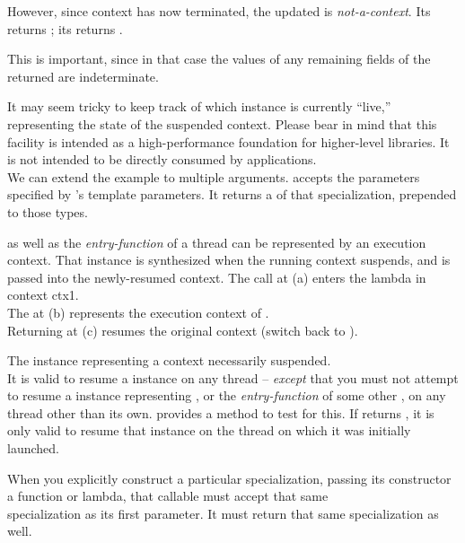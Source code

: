 However, since context  has now terminated, the updated 
is \emph{not-a-context}. Its  returns ;
its  returns .

This is important, since in that case the values of any remaining fields of
the returned  are indeterminate.

It may seem tricky to keep track of which \ectx instance is currently
``live,'' representing the state of the suspended context. Please bear in
mind that this facility is intended as a high-performance foundation for
higher-level libraries. It is not intended to be directly consumed by
applications.\\
\newpage
We can extend the example to multiple arguments.
\op accepts the parameters specified by \ectx's template parameters. It
returns a  of that \ectx specialization, prepended to those
types.


\main as well as the \emph{entry-function} of a thread can be represented by an
execution context. That \ectx instance is synthesized when the running context
suspends, and is passed into the newly-resumed context.
The  call at (a) enters the lambda in context ctx1.\\
The \ectx {} at (b) represents the execution context of \main.\\
Returning  at (c) resumes the original context (switch back to
\main).


The \ectx instance representing a context necessarily suspended.\\
It is
valid to resume a \ectx instance on any thread -- \emph{except} that you must
not attempt to resume a \ectx instance representing \main, or
the \emph{entry-function} of some other , on any thread other
than its own.
\ectx provides a method to test for this.
If  returns , it is
only valid to resume that
\ectx instance on the thread on which it was initially launched.


When you explicitly construct a particular 
specialization, passing its constructor a function or lambda, that callable
must accept that same\\
 specialization as
its first parameter. It must return that
same  specialization as well.

